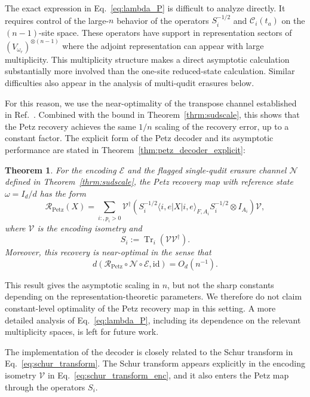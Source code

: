 \documentclass[10pt,twocolumn,superscriptaddress,aps,amsmath,amssymb,citeautoscript,floatfix,prx]{revtex4-2}
\newtheorem{theorem}{Theorem}
\theoremstyle{plain}
\theoremstyle{plain}
\theoremstyle{plain}
\theoremstyle{plain}
\theoremstyle{plain}
\theoremstyle{plain}
\theoremstyle{plain}
\theoremstyle{definition}
\theoremstyle{plain}
\begin{document}
The exact expression in Eq.~\eqref{eq:lambda_P} is difficult to analyze directly. It requires control of the large-$n$ behavior of 
the operators $S_i^{-1/2}$ and $\mathcal C_i(t_a)$ on the $(n-1)$-site space. These operators have support in representation sectors of $(V_{\omega_r})^{\otimes(n-1)}$ 
where the adjoint representation can appear with large multiplicity. This multiplicity structure makes a direct asymptotic calculation substantially more 
involved than the one-site reduced-state calculation. Similar difficulties also appear in the analysis of multi-qudit erasures below.

For this reason, we use the near-optimality of the transpose channel established in Ref.~\cite{Ng2010}. Combined with the bound in Theorem~\ref{thrm:sudscale}, 
this shows that the Petz recovery achieves the same $1/n$ scaling of the recovery error, up to a constant factor. The explicit form of the Petz decoder and its 
asymptotic performance are stated in Theorem~\ref{thm:petz_decoder_explicit}:

\begin{theorem}
For the encoding $\mathcal E$ and the flagged single-qudit erasure channel $\mathcal N$ defined in Theorem~\ref{thrm:sudscale}, 
the Petz recovery map with reference state $\omega=I_d/d$ has the form
$$
\mathcal R_{\mathrm{Petz}}(X)
=
\sum_{i:,p_i>0}
\mathcal{V}^\dagger
\left(
S_i^{-1/2}
\langle i,e|X|i,e\rangle_{F,A_i}
S_i^{-1/2}
\otimes I_{A_i}
\right)
\mathcal{V},
$$
where $\mathcal{V}$ is the encoding isometry and
$$
S_i
:=
\operatorname{Tr}_i\left(\mathcal{V}\mathcal{V}^\dagger\right).
$$
Moreover, this recovery is near-optimal in the sense that
$$
    d\left(
    \mathcal R_{\mathrm{Petz}}
    \circ
    \mathcal N
    \circ
    \mathcal E,
    \mathrm{id}
    \right)
    =
    O_{d}(n^{-1}) .
$$
\end{theorem}

This result gives the asymptotic scaling in $n$, but not the sharp constants depending on the representation-theoretic parameters. 
We therefore do not claim constant-level optimality of the Petz recovery map in this setting. A more detailed analysis of Eq.~\eqref{eq:lambda_P}, 
including its dependence on the relevant multiplicity spaces, is left for future work.

The implementation of the decoder is closely related to the Schur transform in Eq.~\eqref{eq:schur_transform}. 
The Schur transform appears explicitly in the encoding isometry $\mathcal{V}$ in Eq.~\eqref{eq:schur_transform_enc}, and it also enters the Petz map through the operators $S_i$.
\end{document}
